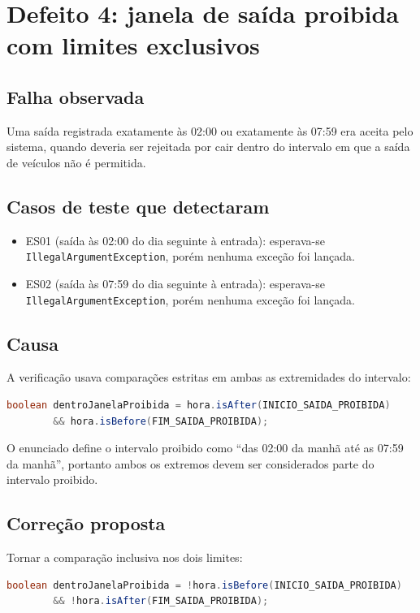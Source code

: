 \documentclass[11pt,a4paper]{article}
\begin{document}
\section*{Defeito 4: janela de saída proibida com limites exclusivos}

\subsection*{Falha observada}
Uma saída registrada exatamente às 02:00 ou exatamente às 07:59 era aceita
pelo sistema, quando deveria ser rejeitada por cair dentro do intervalo em que
a saída de veículos não é permitida.

\subsection*{Casos de teste que detectaram}
\begin{itemize}[nosep]
  \item ES01 (saída às 02:00 do dia seguinte à entrada): esperava-se
        \texttt{IllegalArgumentException}, porém nenhuma exceção foi lançada.
  \item ES02 (saída às 07:59 do dia seguinte à entrada): esperava-se
        \texttt{IllegalArgumentException}, porém nenhuma exceção foi lançada.
\end{itemize}

\subsection*{Causa}
A verificação usava comparações estritas em ambas as extremidades do
intervalo:
\begin{lstlisting}[language=Java]
boolean dentroJanelaProibida = hora.isAfter(INICIO_SAIDA_PROIBIDA)
        && hora.isBefore(FIM_SAIDA_PROIBIDA);
\end{lstlisting}
O enunciado define o intervalo proibido como ``das 02:00 da manhã até as
07:59 da manhã'', portanto ambos os extremos devem ser considerados parte do
intervalo proibido.

\subsection*{Correção proposta}
Tornar a comparação inclusiva nos dois limites:
\begin{lstlisting}[language=Java]
boolean dentroJanelaProibida = !hora.isBefore(INICIO_SAIDA_PROIBIDA)
        && !hora.isAfter(FIM_SAIDA_PROIBIDA);
\end{lstlisting}
\end{document}
